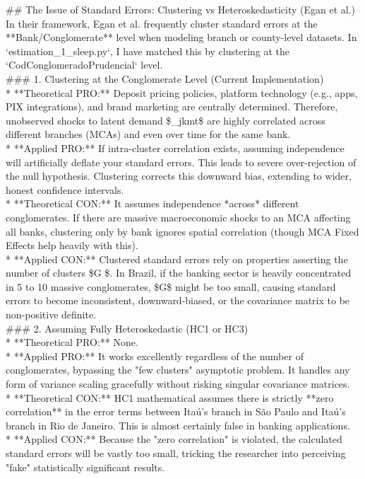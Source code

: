 \documentclass{article}
\begin{document}
\#\# The Issue of Standard Errors: Clustering vs Heteroskedasticity (Egan et al.) \\
In their framework, Egan et al. frequently cluster standard errors at the **Bank/Conglomerate** level when modeling branch or county-level datasets. In `estimation\_1\_sleep.py`, I have matched this by clustering at the `CodConglomeradoPrudencial` level. \\



\#\#\# 1. Clustering at the Conglomerate Level (Current Implementation) \\
*   **Theoretical PRO:** Deposit pricing policies, platform technology (e.g., apps, PIX integrations), and brand marketing are centrally determined. Therefore, unobserved shocks to latent demand \$\nu\_{jkmt}\$ are highly correlated across different branches (MCAs) and even over time for the same bank. \\
*   **Applied PRO:** If intra-cluster correlation exists, assuming independence will artificially deflate your standard errors. This leads to severe over-rejection of the null hypothesis. Clustering corrects this downward bias, extending to wider, honest confidence intervals. \\
*   **Theoretical CON:** It assumes independence *across* different conglomerates. If there are massive macroeconomic shocks to an MCA affecting all banks, clustering only by bank ignores spatial correlation (though MCA Fixed Effects help heavily with this). \\
*   **Applied CON:** Clustered standard errors rely on properties asserting the number of clusters \$G \to \infty\$. In Brazil, if the banking sector is heavily concentrated in 5 to 10 massive conglomerates, \$G\$ might be too small, causing standard errors to become inconsistent, downward-biased, or the covariance matrix to be non-positive definite. \\



\#\#\# 2. Assuming Fully Heteroskedastic (HC1 or HC3) \\
*   **Theoretical PRO:** None. \\
*   **Applied PRO:** It works excellently regardless of the number of conglomerates, bypassing the "few clusters" asymptotic problem. It handles any form of variance scaling gracefully without risking singular covariance matrices. \\
*   **Theoretical CON:** HC1 mathematical assumes there is strictly **zero correlation** in the error terms between Itaú's branch in São Paulo and Itaú's branch in Rio de Janeiro. This is almost certainly false in banking applications. \\
*   **Applied CON:** Because the "zero correlation" is violated, the calculated standard errors will be vastly too small, tricking the researcher into perceiving "fake" statistically significant results. \\
\end{document}
